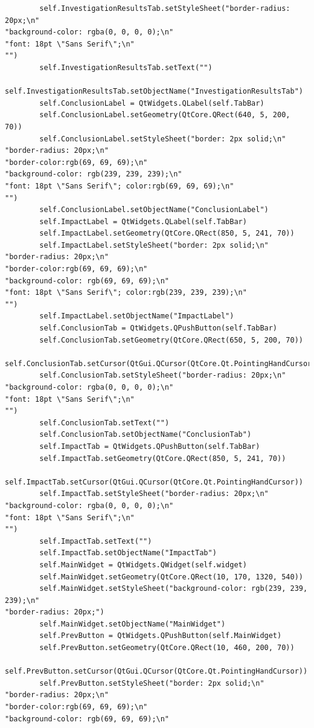 \documentclass[12pt]{article}
\begin{document}
\begin{lstlisting}
        self.InvestigationResultsTab.setStyleSheet("border-radius: 20px;\n"
"background-color: rgba(0, 0, 0, 0);\n"
"font: 18pt \"Sans Serif\";\n"
"")
        self.InvestigationResultsTab.setText("")
        self.InvestigationResultsTab.setObjectName("InvestigationResultsTab")
        self.ConclusionLabel = QtWidgets.QLabel(self.TabBar)
        self.ConclusionLabel.setGeometry(QtCore.QRect(640, 5, 200, 70))
        self.ConclusionLabel.setStyleSheet("border: 2px solid;\n"
"border-radius: 20px;\n"
"border-color:rgb(69, 69, 69);\n"
"background-color: rgb(239, 239, 239);\n"
"font: 18pt \"Sans Serif\"; color:rgb(69, 69, 69);\n"
"")
        self.ConclusionLabel.setObjectName("ConclusionLabel")
        self.ImpactLabel = QtWidgets.QLabel(self.TabBar)
        self.ImpactLabel.setGeometry(QtCore.QRect(850, 5, 241, 70))
        self.ImpactLabel.setStyleSheet("border: 2px solid;\n"
"border-radius: 20px;\n"
"border-color:rgb(69, 69, 69);\n"
"background-color: rgb(69, 69, 69);\n"
"font: 18pt \"Sans Serif\"; color:rgb(239, 239, 239);\n"
"")
        self.ImpactLabel.setObjectName("ImpactLabel")
        self.ConclusionTab = QtWidgets.QPushButton(self.TabBar)
        self.ConclusionTab.setGeometry(QtCore.QRect(650, 5, 200, 70))
        self.ConclusionTab.setCursor(QtGui.QCursor(QtCore.Qt.PointingHandCursor))
        self.ConclusionTab.setStyleSheet("border-radius: 20px;\n"
"background-color: rgba(0, 0, 0, 0);\n"
"font: 18pt \"Sans Serif\";\n"
"")
        self.ConclusionTab.setText("")
        self.ConclusionTab.setObjectName("ConclusionTab")
        self.ImpactTab = QtWidgets.QPushButton(self.TabBar)
        self.ImpactTab.setGeometry(QtCore.QRect(850, 5, 241, 70))
        self.ImpactTab.setCursor(QtGui.QCursor(QtCore.Qt.PointingHandCursor))
        self.ImpactTab.setStyleSheet("border-radius: 20px;\n"
"background-color: rgba(0, 0, 0, 0);\n"
"font: 18pt \"Sans Serif\";\n"
"")
        self.ImpactTab.setText("")
        self.ImpactTab.setObjectName("ImpactTab")
        self.MainWidget = QtWidgets.QWidget(self.widget)
        self.MainWidget.setGeometry(QtCore.QRect(10, 170, 1320, 540))
        self.MainWidget.setStyleSheet("background-color: rgb(239, 239, 239);\n"
"border-radius: 20px;")
        self.MainWidget.setObjectName("MainWidget")
        self.PrevButton = QtWidgets.QPushButton(self.MainWidget)
        self.PrevButton.setGeometry(QtCore.QRect(10, 460, 200, 70))
        self.PrevButton.setCursor(QtGui.QCursor(QtCore.Qt.PointingHandCursor))
        self.PrevButton.setStyleSheet("border: 2px solid;\n"
"border-radius: 20px;\n"
"border-color:rgb(69, 69, 69);\n"
"background-color: rgb(69, 69, 69);\n"

\end{lstlisting}
\end{document}
